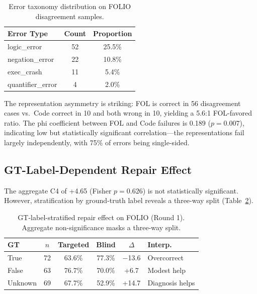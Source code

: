 \documentclass[11pt,a4paper]{article}
\newcommand{\pp}{\text{pp}}
\begin{document}
\begin{table}[t]
\centering
\small
\begin{tabular}{lcc}
\toprule
\textbf{Error Type} & \textbf{Count} & \textbf{Proportion} \\
\midrule
logic\_error & 52 & 25.5\% \\
negation\_error & 22 & 10.8\% \\
exec\_crash & 11 & 5.4\% \\
quantifier\_error & 4 & 2.0\% \\
\bottomrule
\end{tabular}
\caption{Error taxonomy distribution on FOLIO disagreement samples.}
\label{tab:error_taxonomy}
\end{table}

The representation asymmetry is striking: FOL is correct in 56 disagreement cases vs.\ Code correct in 10 and both wrong in 10, yielding a 5.6:1 FOL-favored ratio. The phi coefficient between FOL and Code failures is 0.189 ($p\!=\!0.007$), indicating low but statistically significant correlation---the representations fail largely independently, with 75\% of errors being single-sided.

\subsection{GT-Label-Dependent Repair Effect}
\label{sec:repair_effect}

The aggregate C4 of +4.65\pp{} (Fisher $p\!=\!0.626$) is not statistically significant. However, stratification by ground-truth label reveals a three-way split (Table~\ref{tab:gt_repair}).

\begin{table}[t]
\centering
\small
\begin{tabular}{lccccl}
\toprule
\textbf{GT} & $n$ & \textbf{Targeted} & \textbf{Blind} & $\Delta$ & \textbf{Interp.} \\
\midrule
True & 72 & 63.6\% & 77.3\% & $-$13.6\pp{} & Overcorrect \\
False & 63 & 76.7\% & 70.0\% & +6.7\pp{} & Modest help \\
Unknown & 69 & 67.7\% & 52.9\% & +14.7\pp{} & Diagnosis helps \\
\bottomrule
\end{tabular}
\caption{GT-label-stratified repair effect on FOLIO (Round 1). Aggregate non-significance masks a three-way split.}
\label{tab:gt_repair}
\end{table}
\end{document}
